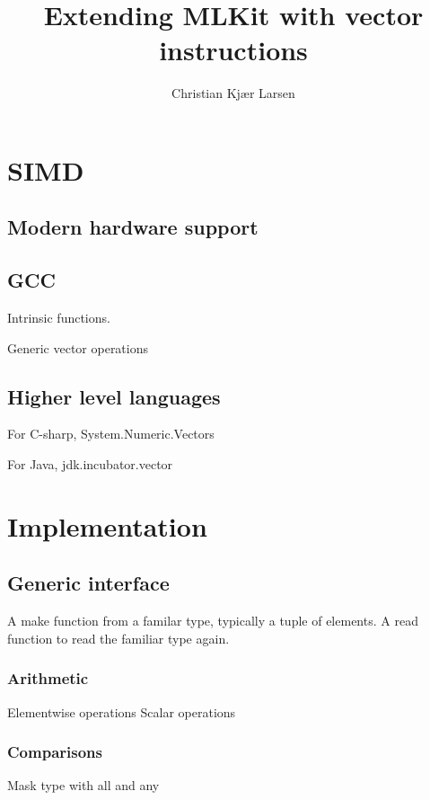 \documentclass{article}
\title{Extending MLKit with vector instructions}
\author{Christian Kjær Larsen}
\begin{document}
\maketitle

\section{SIMD}

\subsection{Modern hardware support}

\subsection{GCC}

Intrinsic functions.

Generic vector operations

\subsection{Higher level languages}

For C-sharp, System.Numeric.Vectors

For Java, jdk.incubator.vector


\section{Implementation}


\subsection{Generic interface}


A make function from a familar type, typically a tuple of elements.
A read function to read the familiar type again.


\subsubsection{Arithmetic}

Elementwise operations
Scalar operations

\subsubsection{Comparisons}

Mask type with all and any
\end{document}
